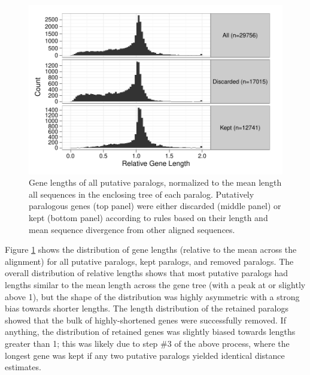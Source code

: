 \begin{figure}
\centering
\includegraphics[scale=0.7]{Figs/filtered_paralogs_hist.pdf}
\caption{Gene lengths of all putative paralogs, normalized to the mean
  length all sequences in the enclosing tree of each
  paralog. Putatively paralogous genes (top panel) were either
  discarded (middle panel) or kept (bottom panel) according to rules
  based on their length and mean sequence divergence from other
  aligned sequences.}
\label{filtered_paralogs_hist}
\end{figure}

Figure \ref{filtered_paralogs_hist} shows the distribution of gene
lengths (relative to the mean across the alignment) for all putative
paralogs, kept paralogs, and removed paralogs. The overall
distribution of relative lengths shows that most putative paralogs had
lengths similar to the mean length across the gene tree (with a peak
at or slightly above 1), but the shape of the distribution was highly
asymmetric with a strong bias towards shorter lengths. The length
distribution of the retained paralogs showed that the bulk of
highly-shortened genes were successfully removed. If anything, the
distribution of retained genes was slightly biased towards lengths
greater than 1; this was likely due to step \#3 of the above process,
where the longest gene was kept if any two putative paralogs yielded
identical distance estimates.

